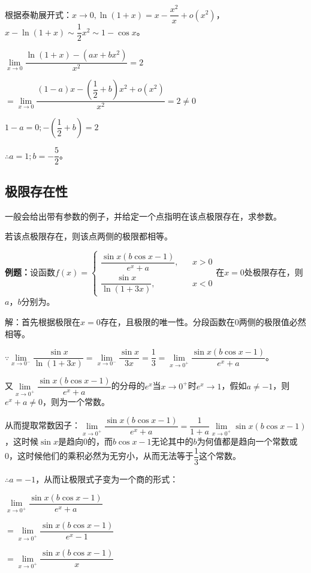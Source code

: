 \documentclass[UTF8, 12pt]{ctexart}
\begin{document}
根据泰勒展开式：$x\to 0,\ln(1+x)=x-\dfrac{x^2}{x}+o(x^2)$，$x-\ln(1+x)\sim\dfrac{1}{2}x^2\sim 1-\cos x$。

$\lim\limits_{x\to 0}\dfrac{\ln(1+x)-(ax+bx^2)}{x^2}=2$

$=\lim\limits_{x\to 0}\dfrac{(1-a)x-\left(\dfrac{1}{2}+b\right)x^2+o(x^2)}{x^2}=2\neq 0$

$1-a=0;-\left(\dfrac{1}{2}+b\right)=2$\medskip

$\therefore a=1;b=-\dfrac{5}{2}$。

\subsection{极限存在性}

一般会给出带有参数的例子，并给定一个点指明在该点极限存在，求参数。

若该点极限存在，则该点两侧的极限都相等。\medskip

\textbf{例题：}设函数$f(x)=\left\{\begin{array}{lcl}
    \dfrac{\sin x(b\cos x-1)}{e^x+a}, & & x>0 \\
    \dfrac{\sin x}{\ln(1+3x)}, & & x<0
\end{array}
\right.$在$x=0$处极限存在，则$a$，$b$分别为。

解：首先根据极限在$x=0$存在，且极限的唯一性。分段函数在0两侧的极限值必然相等。

$\because\lim\limits_{x\to 0^-}\dfrac{\sin x}{\ln(1+3x)}=\lim\limits_{x\to 0^-}\dfrac{\sin x}{3x}=\dfrac{1}{3}=\lim\limits_{x\to 0^+}\dfrac{\sin x(b\cos x-1)}{e^x+a}$。

\medskip

又$\lim\limits_{x\to 0^+}\dfrac{\sin x(b\cos x-1)}{e^x+a}$的分母的$e^x$当$x\to 0^+$时$e^x\to 1$，假如$a\neq-1$，则$e^x+a\neq 0$，则为一个常数。

从而提取常数因子：$\lim\limits_{x\to 0^+}\dfrac{\sin x(b\cos x-1)}{e^x+a}=\dfrac{1}{1+a}\lim\limits_{x\to 0^+}\sin x(b\cos x-1)$，这时候$\sin x$是趋向0的，而$b\cos x-1$无论其中的$b$为何值都是趋向一个常数或0，这时候他们的乘积必然为无穷小，从而无法等于$\dfrac{1}{3}$这个常数。

$\therefore a=-1$，从而让极限式子变为一个商的形式：\medskip

$\lim\limits_{x\to 0^+}\dfrac{\sin x(b\cos x-1)}{e^x+a}$\medskip

$=\lim\limits_{x\to 0^+}\dfrac{\sin x(b\cos x-1)}{e^x-1}$\medskip

$=\lim\limits_{x\to 0^+}\dfrac{\sin x(b\cos x-1)}{x}$\medskip
\end{document}
